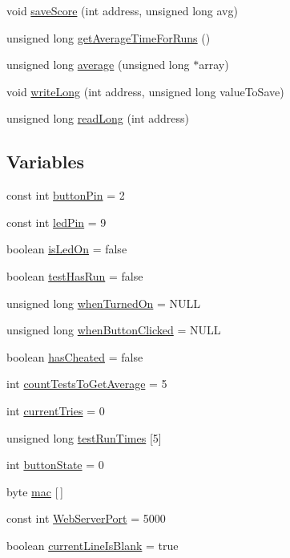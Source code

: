 \begin{DoxyCompactItemize}
\item 
void \mbox{\hyperlink{test_8ino_a4e8d23e3997d5440e6baf9cb26bd0e03}{save\+Score}} (int address, unsigned long avg)
\item 
unsigned long \mbox{\hyperlink{test_8ino_a3991b3fec82a370bed6f323e5496ba34}{get\+Average\+Time\+For\+Runs}} ()
\item 
unsigned long \mbox{\hyperlink{test_8ino_a3f58cad8e546d58d8d275655e22964c9}{average}} (unsigned long $\ast$array)
\item 
void \mbox{\hyperlink{test_8ino_a5b02fbb87448a058cc6f3d4a1158afc2}{write\+Long}} (int address, unsigned long value\+To\+Save)
\item 
unsigned long \mbox{\hyperlink{test_8ino_a9481ce48d8cc7194d54460345fdc4a1e}{read\+Long}} (int address)
\end{DoxyCompactItemize}
\subsection*{Variables}
\begin{DoxyCompactItemize}
\item 
const int \mbox{\hyperlink{test_8ino_a4ddb8b6ae564eb22f7c74f2683a63b8e}{button\+Pin}} = 2
\item 
const int \mbox{\hyperlink{test_8ino_a2cd9f0d96c9cd0637798de3baa7aee60}{led\+Pin}} = 9
\item 
boolean \mbox{\hyperlink{test_8ino_aee47635c78d9c5f0aa27183bfa35d819}{is\+Led\+On}} = false
\item 
boolean \mbox{\hyperlink{test_8ino_a9c86e8e71b0cc50fc8b7362cf5dfe382}{test\+Has\+Run}} = false
\item 
unsigned long \mbox{\hyperlink{test_8ino_ab7291a0ad43230de4527fd9a0884a286}{when\+Turned\+On}} = N\+U\+LL
\item 
unsigned long \mbox{\hyperlink{test_8ino_afe4223fc496cda29c29b82bbb8f09b48}{when\+Button\+Clicked}} = N\+U\+LL
\item 
boolean \mbox{\hyperlink{test_8ino_a67def723225fceb32a57f7024f7588e8}{has\+Cheated}} = false
\item 
int \mbox{\hyperlink{test_8ino_a24ea86697f33c3769f06300cc30b6cf3}{count\+Tests\+To\+Get\+Average}} = 5
\item 
int \mbox{\hyperlink{test_8ino_ac90ba0cf53c85fd16b8d95d1f0f9c298}{current\+Tries}} = 0
\item 
unsigned long \mbox{\hyperlink{test_8ino_ac462bdb2739adfafcdc80951a7ca009a}{test\+Run\+Times}} \mbox{[}5\mbox{]}
\item 
int \mbox{\hyperlink{test_8ino_a5002611f83f5a861df12917dd5651db8}{button\+State}} = 0
\item 
byte \mbox{\hyperlink{test_8ino_aea3f7775fecafb66a619eb2dcb0357bd}{mac}} \mbox{[}$\,$\mbox{]}
\item 
const int \mbox{\hyperlink{test_8ino_af37b150d7960fc164e55cf58aade65a3}{Web\+Server\+Port}} = 5000
\item 
boolean \mbox{\hyperlink{test_8ino_ae60621cb69fbfeb47e82e766ed90c581}{current\+Line\+Is\+Blank}} = true
\end{DoxyCompactItemize}


